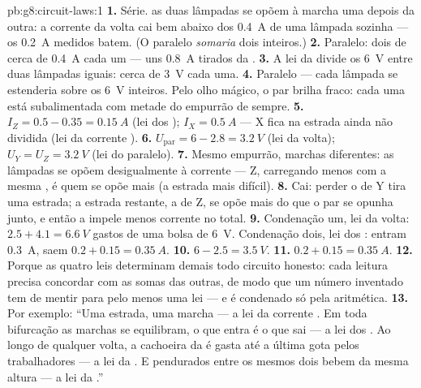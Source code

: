 \begin{solution}{pb:g8:circuit-laws:1}
\textbf{1.} Série.  as duas lâmpadas se opõem à marcha uma
depois da outra: a corrente da volta cai bem abaixo dos \qty{0.4}{A}
de uma lâmpada sozinha --- os \qty{0.2}{A} medidos batem. (O paralelo
\emph{somaria} dois  inteiros.)
\textbf{2.} Paralelo: dois  de cerca de \qty{0.4}{A} cada um ---
uns \qty{0.8}{A} tirados da .
\textbf{3.} A lei da   divide os \qty{6}{V} entre duas
lâmpadas iguais: cerca de \qty{3}{V} cada uma.
\textbf{4.} Paralelo --- cada lâmpada se estenderia sobre os
\qty{6}{V} inteiros. Pelo olho mágico, o par  brilha fraco:
cada uma está subalimentada com metade do empurrão de sempre.
\textbf{5.} $I_Z = 0.5 - 0.35 = \qty{0.15}{A}$ (lei dos );
$I_X = \qty{0.5}{A}$ --- X fica na estrada ainda não dividida (lei da
corrente ).
\textbf{6.} $U_{\text{par}} = 6 - 2.8 = \qty{3.2}{V}$ (lei da volta);
$U_Y = U_Z = \qty{3.2}{V}$ (lei do paralelo).
\textbf{7.} Mesmo empurrão, marchas diferentes: as lâmpadas se opõem
desigualmente à corrente --- Z, carregando menos com a mesma ,
é quem se opõe mais (a estrada mais difícil).
\textbf{8.} Cai: perder o  de Y tira uma estrada; a estrada
restante, a de Z, se opõe mais do que o par se opunha junto, e então
a  impele menos corrente no total.
\textbf{9.} Condenação um, lei da volta:
$2.5 + 4.1 = \qty{6.6}{V}$ gastos de uma bolsa de \qty{6}{V}.
Condenação dois, lei dos : entram \qty{0.3}{A}, saem
$0.2 + 0.15 = \qty{0.35}{A}$.
\textbf{10.} $6 - 2.5 = \qty{3.5}{V}$.
\textbf{11.} $0.2 + 0.15 = \qty{0.35}{A}$.
\textbf{12.} Porque as quatro leis determinam demais todo circuito
honesto: cada leitura precisa concordar com as somas das outras, de
modo que um número inventado tem de mentir para pelo menos uma lei
--- e é condenado só pela aritmética.
\textbf{13.} Por exemplo: ``Uma estrada, uma marcha --- a lei da
corrente . Em toda bifurcação as marchas se equilibram, o que
entra é o que sai --- a lei dos . Ao longo de qualquer volta, a
cachoeira da  é gasta até a última gota pelos trabalhadores ---
a lei da  . E  pendurados entre os mesmos dois 
bebem da mesma altura --- a lei da  .''
\end{solution}
